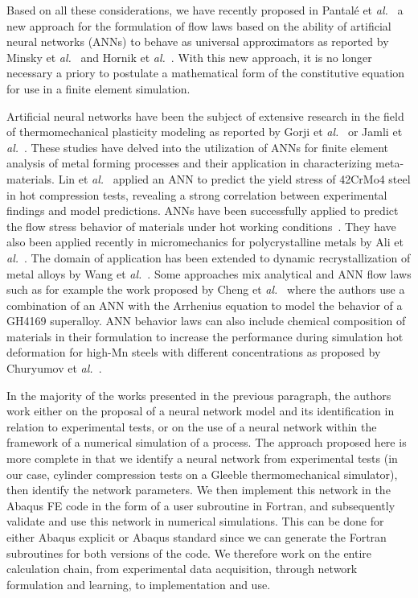 \documentclass[algorithms,article,submit,pdftex,oneauthors]{Definitions/mdpi}
\makeatletter
\DeclareRobustCommand{\eal}{et \emph{al.}\@\xspace}
\makeatother
\begin{document}
Based on all these considerations, we have recently proposed in Pantalé \eal~\cite{Pantale-2021-EIN, Pantale-2023-DIA} a new approach for the formulation of flow laws based on the ability of artificial neural networks (ANNs) to behave as universal approximators as reported by Minsky \eal~\cite{Minsky-1969-PIC} and Hornik \eal~\cite{Hornik-1989-MFN}.
With this new approach, it is no longer necessary a priory to postulate a mathematical form of the constitutive equation for use in a finite element simulation.

Artificial neural networks have been the subject of extensive research in the field of thermomechanical plasticity modeling as reported by Gorji \eal~\cite{Gorji-2020} or Jamli \eal~\cite{Jamli-2019-SNN}.
These studies have delved into the utilization of ANNs for finite element analysis of metal forming processes and their application in characterizing meta-materials.
Lin \eal~\cite{Lin-2008} applied an ANN to predict the yield stress of 42CrMo4 steel in hot compression tests, revealing a strong correlation between experimental findings and model predictions.
ANNs have been successfully applied to predict the flow stress behavior of materials under hot working conditions~\cite{Stoffel-2018-ANN, Stoffel-2019-NNB}.
They have also been applied recently in micromechanics for polycrystalline metals by Ali \eal~\cite{Ali-2019-AAN}.
The domain of application has been extended to dynamic recrystallization of metal alloys by Wang \eal~\cite{Wang-2021-ANN}.
Some approaches mix analytical and ANN flow laws such as for example the work proposed by Cheng \eal~\cite{Cheng-2022-CWD} where the authors use a combination of an ANN with the Arrhenius equation to model the behavior of a GH4169 superalloy.
ANN behavior laws can also include chemical composition of materials in their formulation to increase the performance during simulation hot deformation for high-Mn steels with different concentrations as proposed by Churyumov \eal~\cite{Churyumov-2023-PTS}.

In the majority of the works presented in the previous paragraph, the authors work either on the proposal of a neural network model and its identification in relation to experimental tests, or on the use of a neural network within the framework of a numerical simulation of a process.
The approach proposed here is more complete in that we identify a neural network from experimental tests (in our case, cylinder compression tests on a Gleeble thermomechanical simulator), then identify the network parameters.
We then implement this network in the Abaqus FE code in the form of a user subroutine in Fortran, and subsequently validate and use this network in numerical simulations.
This can be done for either Abaqus explicit or Abaqus standard since we can generate the Fortran subroutines for both versions of the code. 
We therefore work on the entire calculation chain, from experimental data acquisition, through network formulation and learning, to implementation and use.
\end{document}

